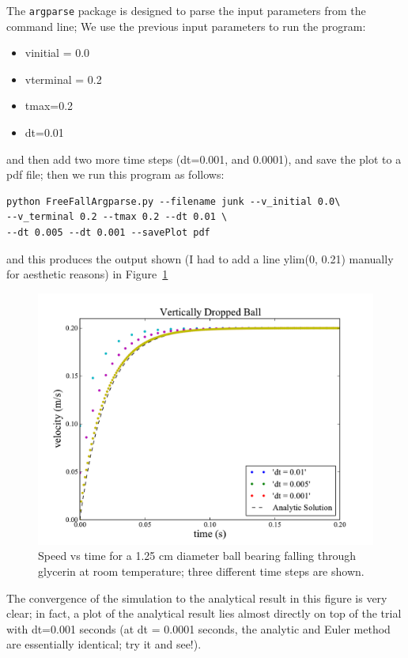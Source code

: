 The \texttt{argparse} package is designed to parse the input parameters from the command line; 
We use the previous input parameters to run the program: 
\begin{itemize}
	\item vinitial = 0.0
	\item vterminal = 0.2
	\item tmax=0.2
	\item dt=0.01
\end{itemize}
and then add two more time steps (dt=0.001, and 0.0001), and save the plot to a pdf file; then we run this program as follows:\\
\begin{lstlisting}[style = pythonSnippet]
python FreeFallArgparse.py --filename junk --v_initial 0.0\
--v_terminal 0.2 --tmax 0.2 --dt 0.01 \
--dt 0.005 --dt 0.001 --savePlot pdf
\end{lstlisting}
and this produces the output shown (I had to add a line ylim(0, 0.21) manually for aesthetic reasons) in Figure~\ref{fig:FreeFallArgparse}
\begin{figure}[b]
\centering
\includegraphics[width = \textwidth]{Figures/Kinematics/FreeFallArgparse.pdf}
\caption{Speed vs time for a 1.25 cm diameter ball bearing falling through glycerin at room temperature; three different time steps are shown.}
\label{fig:FreeFallArgparse}       %
\end{figure}
The convergence of the simulation to the analytical result in this figure is very clear; in fact, a plot of the analytical result lies almost directly on top of the trial with dt=0.001 seconds (at dt = 0.0001 seconds, the analytic and Euler method are essentially identical; try it and see!).




